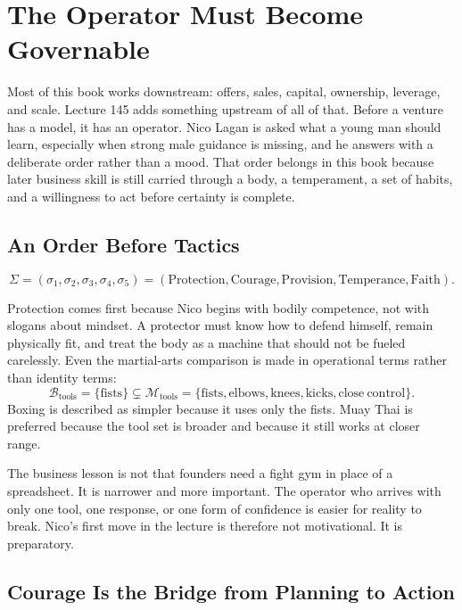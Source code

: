 \documentclass[11pt,oneside]{book}
\begin{document}
\chapter{The Operator Must Become Governable}

Most of this book works downstream: offers, sales, capital, ownership, leverage, and scale. Lecture 145 adds something upstream of all of that. Before a venture has a model, it has an operator. Nico Lagan is asked what a young man should learn, especially when strong male guidance is missing, and he answers with a deliberate order rather than a mood. That order belongs in this book because later business skill is still carried through a body, a temperament, a set of habits, and a willingness to act before certainty is complete.

\section{An Order Before Tactics}

\begin{equation}
\Sigma=(\sigma_1,\sigma_2,\sigma_3,\sigma_4,\sigma_5)
=(\mathrm{Protection},\mathrm{Courage},\mathrm{Provision},\mathrm{Temperance},\mathrm{Faith}).
\end{equation}

Protection comes first because Nico begins with bodily competence, not with slogans about mindset. A protector must know how to defend himself, remain physically fit, and treat the body as a machine that should not be fueled carelessly. Even the martial-arts comparison is made in operational terms rather than identity terms:
\begin{equation}
\mathcal{B}_{\mathrm{tools}}=\{\mathrm{fists}\}
\subsetneq
\mathcal{M}_{\mathrm{tools}}=\{\mathrm{fists},\mathrm{elbows},\mathrm{knees},\mathrm{kicks},\mathrm{close\ control}\}.
\end{equation}
Boxing is described as simpler because it uses only the fists. Muay Thai is preferred because the tool set is broader and because it still works at closer range.

The business lesson is not that founders need a fight gym in place of a spreadsheet. It is narrower and more important. The operator who arrives with only one tool, one response, or one form of confidence is easier for reality to break. Nico's first move in the lecture is therefore not motivational. It is preparatory.

\section{Courage Is the Bridge from Planning to Action}
\end{document}
